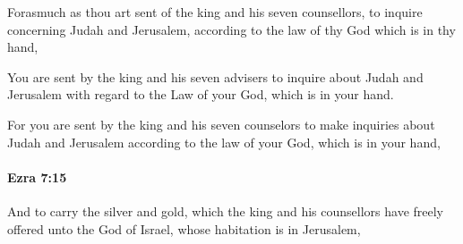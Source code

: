 			\begin{versebox}
					\item[BHS] 
					\item[LXX] 
					\item[ASV] Forasmuch as thou art sent of the king and his seven counsellors, to inquire concerning Judah and Jerusalem, according to the law of thy God which is in thy hand,
					\item[NIV] You are sent by the king and his seven advisers to inquire about Judah and Jerusalem with regard to the Law of your God, which is in your hand.
					\item[NRSV] For you are sent by the king and his seven counselors to make inquiries about Judah and Jerusalem according to the law of your God, which is in your hand,
			\end{versebox}

		\paragraph{Ezra 7:15} %
			\label{EZRA-7-15}

			And to carry the silver and gold, which the king and his counsellors have freely offered unto the God of Israel, whose habitation is in Jerusalem,

